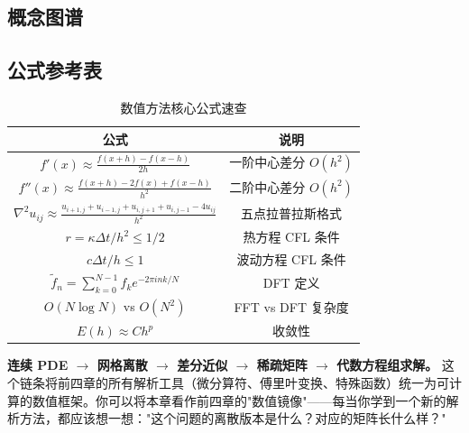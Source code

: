 \subsection*{概念图谱}

\begin{center}
\end{center}

\subsection*{公式参考表}

\begin{table}[h]
\centering
\caption{数值方法核心公式速查}
\label{tab:numerical_formulas}
\begin{tabular}{c|c}
\toprule
公式 & 说明 \\
\midrule
$f'(x) \approx \frac{f(x+h)-f(x-h)}{2h}$ & 一阶中心差分 $O(h^2)$ \\
$f''(x) \approx \frac{f(x+h)-2f(x)+f(x-h)}{h^2}$ & 二阶中心差分 $O(h^2)$ \\
$\nabla^2 u_{ij} \approx \frac{u_{i+1,j}+u_{i-1,j}+u_{i,j+1}+u_{i,j-1}-4u_{ij}}{h^2}$ & 五点拉普拉斯格式 \\
$r = \kappa\Delta t/h^2 \leq 1/2$ & 热方程 CFL 条件 \\
$c\Delta t/h \leq 1$ & 波动方程 CFL 条件 \\
$\tilde{f}_n = \sum_{k=0}^{N-1} f_k e^{-2\pi i nk/N}$ & DFT 定义 \\
$O(N\log N)$ vs $O(N^2)$ & FFT vs DFT 复杂度 \\
$E(h) \approx C h^p$ & 收敛性 \\
\bottomrule
\end{tabular}
\end{table}

\begin{insight}[第 5 章的核心思维链条]
\textbf{连续 PDE $\to$ 网格离散 $\to$ 差分近似 $\to$ 稀疏矩阵 $\to$ 代数方程组求解。} 这个链条将前四章的所有解析工具（微分算符、傅里叶变换、特殊函数）统一为可计算的数值框架。你可以将本章看作前四章的"数值镜像"——每当你学到一个新的解析方法，都应该想一想："这个问题的离散版本是什么？对应的矩阵长什么样？"
\end{insight}

